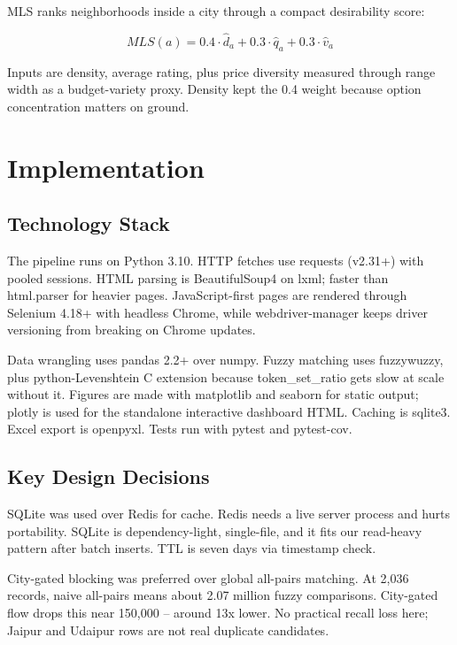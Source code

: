 \documentclass[conference]{IEEEtran}
\begin{document}
MLS ranks neighborhoods inside a city through a compact desirability score:

\begin{equation}
MLS(a) = 0.4 \cdot \hat{d}_a + 0.3 \cdot \hat{q}_a + 0.3 \cdot \hat{v}_a \label{eq:mls}
\end{equation}

Inputs are density, average rating, plus price diversity measured through range width as a budget-variety proxy. Density kept the 0.4 weight because option concentration matters on ground.

\section{Implementation}

\subsection{Technology Stack}

The pipeline runs on Python 3.10. HTTP fetches use requests (v2.31+) with pooled sessions. HTML parsing is BeautifulSoup4 on lxml; faster than html.parser for heavier pages. JavaScript-first pages are rendered through Selenium 4.18+ with headless Chrome, while webdriver-manager keeps driver versioning from breaking on Chrome updates.

Data wrangling uses pandas 2.2+ over numpy. Fuzzy matching uses fuzzywuzzy, plus python-Levenshtein C extension because token\_set\_ratio gets slow at scale without it. Figures are made with matplotlib and seaborn for static output; plotly is used for the standalone interactive dashboard HTML. Caching is sqlite3. Excel export is openpyxl. Tests run with pytest and pytest-cov.

\subsection{Key Design Decisions}

SQLite was used over Redis for cache. Redis needs a live server process and hurts portability. SQLite is dependency-light, single-file, and it fits our read-heavy pattern after batch inserts. TTL is seven days via timestamp check.

City-gated blocking was preferred over global all-pairs matching. At 2,036 records, naive all-pairs means about 2.07 million fuzzy comparisons. City-gated flow drops this near 150,000 -- around 13x lower. No practical recall loss here; Jaipur and Udaipur rows are not real duplicate candidates.
\end{document}
